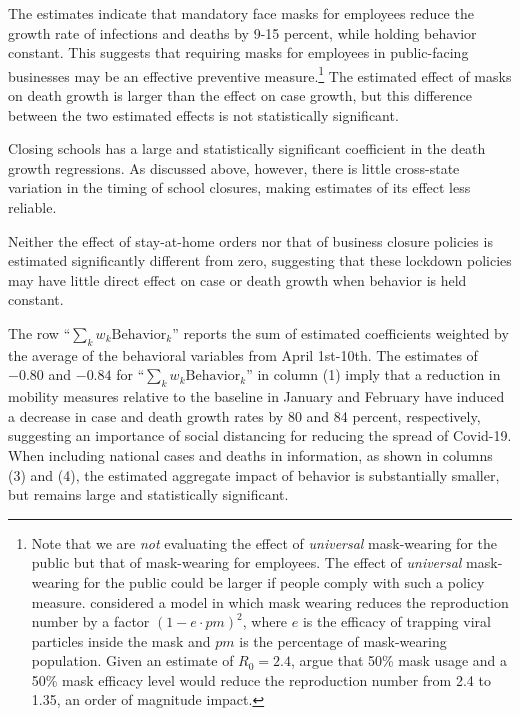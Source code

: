 \documentclass[11pt,reqno,letter]{amsart}
\theoremstyle{definition}
\begin{document}
The estimates indicate that mandatory face masks for employees
reduce the growth rate of infections and deaths by 9-15 percent, while holding behavior constant. This suggests that
requiring masks for employees in public-facing businesses may be an effective preventive measure.\footnote{Note that we are \textit{not} evaluating the effect of \textit{universal} mask-wearing for the public but that of mask-wearing for employees. The effect of \textit{universal} mask-wearing for the public could be larger if people comply with such a policy measure. \cite{tian2020calibrated} considered a  model in which mask wearing reduces  the reproduction number by a factor $(1-e \cdot pm)^2$, where $e$ is the efficacy of trapping viral particles inside the mask and $pm$ is the percentage of mask-wearing population. Given an estimate of $R_0=2.4$, \cite{howard2020} argue that  50\% mask usage and a 50\% mask efficacy level would reduce the reproduction number from 2.4 to 1.35, an order of magnitude
impact.} The estimated effect of masks on death growth is larger than the effect on case growth, but this difference between the two estimated effects is not statistically significant.

Closing schools has a large and statistically
significant coefficient in the death growth regressions. As discussed
above, however, there is little cross-state variation in the timing of school
closures, making estimates of its effect less reliable.

Neither the effect of stay-at-home orders nor that of business closure policies is estimated significantly different from zero, suggesting that these lockdown policies may  have little direct
effect on case or death growth when behavior is held constant.



The row ``$\sum_k w_k \mathrm{Behavior}_k$'' reports the sum of estimated coefficients weighted by the average of the behavioral
variables from April 1st-10th. The estimates of $-0.80$ and $-0.84$ for ``$\sum_k w_k \mathrm{Behavior}_k$'' in column (1)  imply that a reduction in mobility measures relative to the baseline in January and February have induced a decrease in case and death growth rates by 80 and 84 percent, respectively, suggesting an importance of social distancing for reducing the spread of Covid-19.
When including national cases and deaths in information, as shown in columns (3) and (4), the estimated aggregate impact of behavior is substantially smaller, but remains large and statistically significant.
\end{document}
